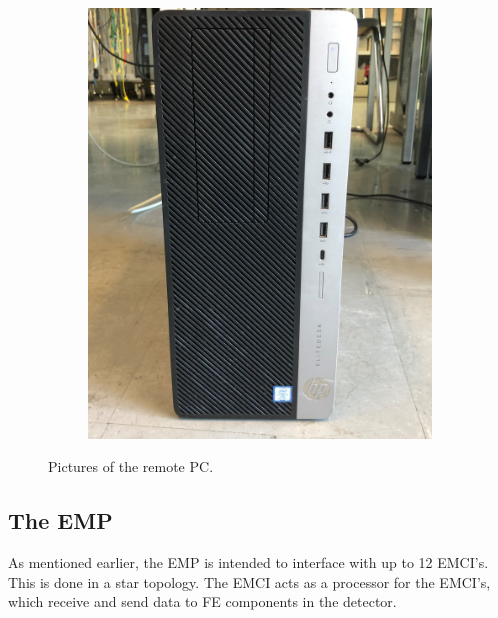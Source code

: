 \begin{figure}[H]
\begin{subfigure}[b]{0.45\textwidth}
         \includegraphics[width=1\textwidth]{Graphics/remPCfront.jpg}
     \end{subfigure}
     \hfill
        \caption{Pictures of the remote PC.}
        \label{fig:three graphs}
\end{figure}


\subsection{The EMP}

As mentioned earlier, the EMP is intended to interface with up to 12 EMCI's. This is done in a star topology. The EMCI acts as a processor for the EMCI's, which receive and send data to FE components in the detector.

